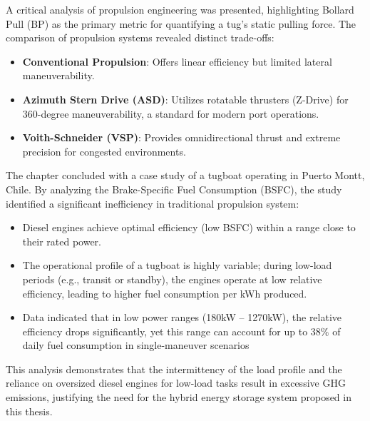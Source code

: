 A critical analysis of propulsion engineering was presented, highlighting Bollard Pull (BP) as the primary metric for quantifying a tug's static pulling force. The comparison of propulsion systems revealed distinct trade-offs:

\begin{itemize}
	\item \textbf{Conventional Propulsion}: Offers linear efficiency but limited lateral maneuverability.
	\item \textbf{Azimuth Stern Drive (ASD)}: Utilizes rotatable thrusters (Z-Drive) for 360-degree maneuverability, a standard for modern port operations.
	\item \textbf{Voith-Schneider (VSP)}: Provides omnidirectional thrust and extreme precision for congested environments.  
\end{itemize}


The chapter concluded with a case study of a tugboat operating in Puerto Montt, Chile. By analyzing the Brake-Specific Fuel Consumption (BSFC), the study identified a significant inefficiency in traditional propulsion system:

\begin{itemize}
	\item Diesel engines achieve optimal efficiency (low BSFC) within a range close to their rated power.
	\item The operational profile of a tugboat is highly variable; during low-load periods (e.g., transit or standby), the engines operate at low relative efficiency, leading to higher fuel consumption per kWh produced.
	\item Data indicated that in low power ranges (180kW – 1270kW), the relative efficiency drops significantly, yet this range can account for up to $38\%$ of daily fuel consumption in single-maneuver scenarios
\end{itemize}

This analysis demonstrates that the intermittency of the load profile and the reliance on oversized diesel engines for low-load tasks result in excessive GHG emissions, justifying the need for the hybrid energy storage system proposed in this thesis.

